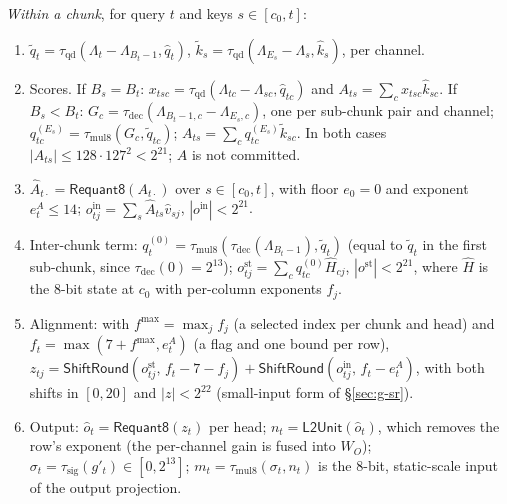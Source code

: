 \documentclass[11pt]{article}
\begin{document}
\emph{Within a chunk}, for query \(t\) and keys \(s \in [c_0, t]\):
\begin{enumerate}
\item \(\tilde q_t = \tau_{\mathrm{qd}}(\Lambda_t - \Lambda_{B_t-1}, \hat q_t)\), \(\tilde k_s = \tau_{\mathrm{qd}}(\Lambda_{E_s} - \Lambda_s, \hat k_s)\), per channel.
\item Scores. If \(B_s = B_t\): \(x_{tsc} = \tau_{\mathrm{qd}}(\Lambda_{tc} - \Lambda_{sc}, \hat q_{tc})\) and \(A_{ts} = \sum_c x_{tsc} \hat k_{sc}\).
If \(B_s < B_t\): \(G_{c} = \tau_{\mathrm{dec}}(\Lambda_{B_t - 1, c} - \Lambda_{E_s, c})\), one per sub-chunk pair and channel; \(q^{(E_s)}_{tc} = \tau_{\mathrm{mul8}}(G_c, \tilde q_{tc})\); \(A_{ts} = \sum_c q^{(E_s)}_{tc} \tilde k_{sc}\).
In both cases \(|A_{ts}| \le 128\cdot 127^2 < 2^{21}\); \(A\) is not committed.
\item \(\hat A_{t\cdot} = \mathsf{Requant8}(A_{t\cdot})\) over \(s \in [c_0, t]\), with floor \(e_0 = 0\) and exponent \(e^A_t \le 14\); \(o^{\mathrm{in}}_{tj} = \sum_s \hat A_{ts} \hat v_{sj}\), \(|o^{\mathrm{in}}| < 2^{21}\).
\item Inter-chunk term: \(q^{(0)}_t = \tau_{\mathrm{mul8}}(\tau_{\mathrm{dec}}(\Lambda_{B_t-1}), \tilde q_t)\) (equal to \(\tilde q_t\) in the first sub-chunk, since \(\tau_{\mathrm{dec}}(0) = 2^{13}\)); \(o^{\mathrm{st}}_{tj} = \sum_c q^{(0)}_{tc} \hat H_{cj}\), \(|o^{\mathrm{st}}| < 2^{21}\), where \(\hat H\) is the \(8\)-bit state at \(c_0\) with per-column exponents \(f_j\).
\item Alignment: with \(f^{\max} = \max_j f_j\) (a selected index per chunk and head) and \(f_t = \max(7 + f^{\max}, e^A_t)\) (a flag and one bound per row),
\(z_{tj} = \mathsf{ShiftRound}(o^{\mathrm{st}}_{tj},\, f_t - 7 - f_j) + \mathsf{ShiftRound}(o^{\mathrm{in}}_{tj},\, f_t - e^A_t)\), with both shifts in \([0, 20]\) and \(|z| < 2^{22}\) (small-input form of \S\ref{sec:g-sr}).
\item Output: \(\hat o_t = \mathsf{Requant8}(z_t)\) per head; \(n_t = \mathsf{L2Unit}(\hat o_t)\), which removes the row's exponent (the per-channel gain is fused into \(W_O\)); \(\sigma_t = \tau_{\mathrm{sig}}(g'_t) \in [0, 2^{13}]\); \(m_t = \tau_{\mathrm{mul8}}(\sigma_t, n_t)\) is the \(8\)-bit, static-scale input of the output projection.
\end{enumerate}
\end{document}
